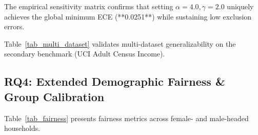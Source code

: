 \documentclass[conference]{IEEEtran}
\begin{document}
The empirical sensitivity matrix confirms that setting $\alpha=4.0, \gamma=2.0$ uniquely achieves the global minimum ECE (**0.0251**) while sustaining low exclusion errors.

Table~\ref{tab_multi_dataset} validates multi-dataset generalizability on the secondary benchmark (UCI Adult Census Income).

\begin{table}[htbp]
\caption{Multi-Dataset Benchmark (Dataset 2: UCI Adult Income)}
\begin{center}
\label{tab_multi_dataset}
\end{center}
\end{table}

\subsection{RQ4: Extended Demographic Fairness & Group Calibration}

Table~\ref{tab_fairness} presents fairness metrics across female- and male-headed households.
\end{document}
